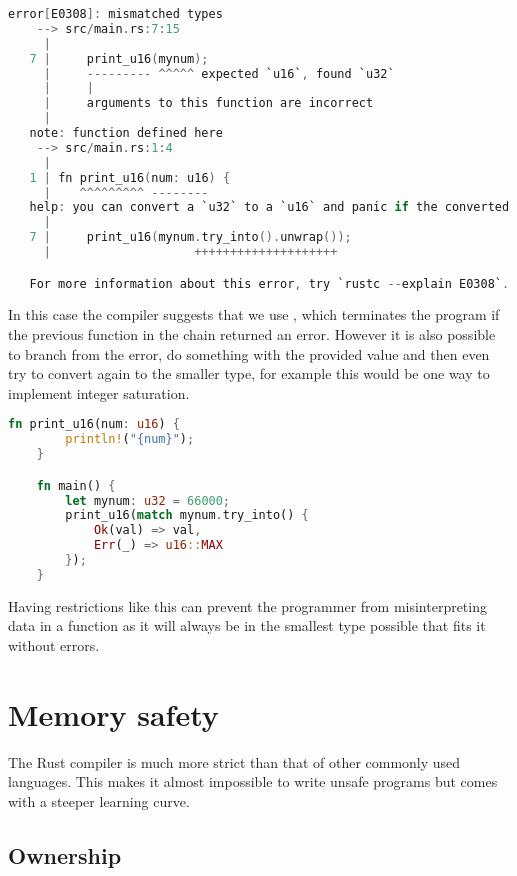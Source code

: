 \begin{lstlisting}[language=C,frame=single,float=!ht,label={lst:rust-reverse-conv-error},caption={Rust Type Conversion Error}]
    error[E0308]: mismatched types
    --> src/main.rs:7:15
     |
   7 |     print_u16(mynum);
     |     --------- ^^^^^ expected `u16`, found `u32`
     |     |
     |     arguments to this function are incorrect
     |
   note: function defined here
    --> src/main.rs:1:4
     |
   1 | fn print_u16(num: u16) {
     |    ^^^^^^^^^ --------
   help: you can convert a `u32` to a `u16` and panic if the converted value doesn't fit
     |
   7 |     print_u16(mynum.try_into().unwrap());
     |                    ++++++++++++++++++++

   For more information about this error, try `rustc --explain E0308`.
\end{lstlisting}

In this case the compiler suggests that we use , which terminates the program if the previous function in the chain returned an error. However it is also possible to branch from the error, do something with the provided value and then even try to convert again to the smaller type, for example this would be one way to implement integer saturation.

\begin{lstlisting}[language=Rust,frame=single,float=!ht,style=customrust,label={lst:rust-cap-integer},caption={Branching from an Error}]
    fn print_u16(num: u16) {
        println!("{num}");
    }

    fn main() {
        let mynum: u32 = 66000;
        print_u16(match mynum.try_into() {
            Ok(val) => val,
            Err(_) => u16::MAX
        });
    }
\end{lstlisting}

Having restrictions like this can prevent the programmer from misinterpreting data in a function as it will always be in the smallest type possible that fits it without errors.

\section{Memory safety}

The Rust compiler is much more strict than that of other commonly used languages. This makes it almost impossible to write unsafe programs but comes with a steeper learning curve.

\subsection{Ownership}

